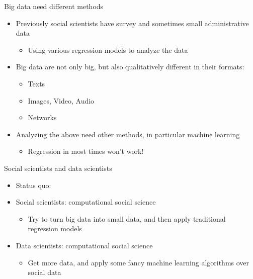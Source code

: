 \documentclass[handout]{beamer}
\begin{document}
\begin{frame}[label={h:e9dbd88d-d6bd-46bb-8ba6-ae1b3aa25032}]{Big data need different methods}
\begin{itemize}
\item Previously social scientists have survey and sometimes small administrative data
\begin{itemize}
\item Using various \alert{regression} models to analyze the data
\end{itemize}
\item Big data are not only big, but also qualitatively different in their formats:
\begin{itemize}
\item Texts
\item Images, Video, Audio
\item Networks
\end{itemize}
\item Analyzing the above need other methods, in particular \alert{machine learning}
\begin{itemize}
\item Regression in most times won't work!
\end{itemize}
\end{itemize}
\end{frame}

\begin{frame}[label={h:a93f4d62-64b3-4304-bce1-3fa736e52498}]{Social scientists and data scientists}
\begin{itemize}
\item Status quo:
\item Social scientists: computational \alert{social science}
\begin{itemize}
\item Try to turn big data into small data, and then apply traditional regression models
\end{itemize}
\item Data scientists: \alert{computational} social science
\begin{itemize}
\item Get more data, and apply some fancy machine learning algorithms over social data
\end{itemize}
\end{itemize}
\end{frame}
\end{document}
